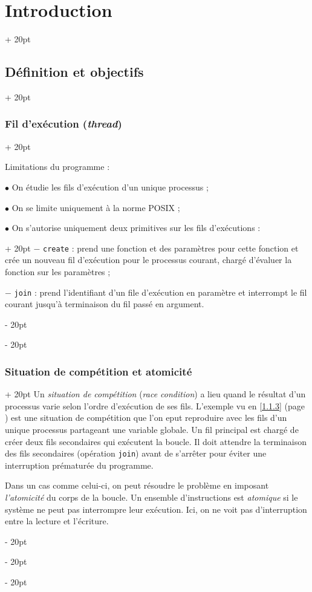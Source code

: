 \documentclass[a4paper, 12pt, twoside]{article}
\newcommand{\ind}[1][20pt]{\advance\leftskip + #1}
\newcommand{\deind}[1][20pt]{\advance\leftskip - #1}
\newenvironment{indt}[2][20pt]{#2 \par \ind[#1]}{\par \deind} %
\begin{document}
\begin{indt}{\section{Introduction}}
\begin{indt}{\subsection{Définition et objectifs}}
\begin{indt}{\subsubsection{Fil d'exécution (\textit{thread})}}
                \vspace{12pt}
                
                Limitations du programme :

                $\bullet$ On étudie les fils d'exécution d'un unique processus ;

                $\bullet$ On se limite uniquement à la norme POSIX ;

                \begin{indt}{$\bullet$ On s'autorise uniquement deux primitives sur les fils d'exécutions :}
                    $-$ \texttt{create} : prend une fonction et des paramètres pour cette fonction et crée un nouveau fil d'exécution pour le processus courant, chargé d'évaluer la fonction sur les paramètres ;

                    $-$ \texttt{join} : prend l'identifiant d'un file d'exécution en paramètre et interrompt le fil courant jusqu'à terminaison du fil passé en argument.
                \end{indt}
            \end{indt}

            \vspace{12pt}
            
            \begin{indt}{\subsubsection{Situation de compétition et atomicité}}
                Un \textit{situation de compétition} (\textit{race condition}) a lieu quand le résultat d'un processus varie selon l'ordre d'exécution de ses fils. L'exemple vu en \ref{1.1.3} (page \pageref{1.1.3}) est une situation de compétition que l'on eput reproduire avec les fils d'un unique processus partageant une variable globale.
                Un fil principal est chargé de créer deux fils secondaires qui exécutent la boucle.
                Il doit attendre la terminaison des fils secondaires (opération \texttt{join}) avant de s'arrêter pour éviter une interruption prématurée du programme.

                Dans un cas comme celui-ci, on peut résoudre le problème en imposant \textit{l'atomicité} du corps de la boucle. Un ensemble d'instructions est \textit{atomique} si le système ne peut pas interrompre leur exécution. Ici, on ne voit pas d'interruption entre la lecture et l'écriture.
            \end{indt}


\end{indt}
\end{indt}
\end{document}
